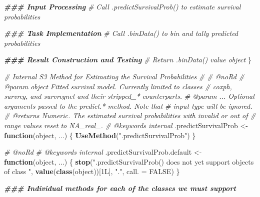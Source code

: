 \documentclass[
]{book}
\newenvironment{Shaded}{\begin{snugshade}}{\end{snugshade}}
\newcommand{\AttributeTok}[1]{\textcolor[rgb]{0.13,0.29,0.53}{#1}}
\newcommand{\CommentTok}[1]{\textcolor[rgb]{0.56,0.35,0.01}{\textit{#1}}}
\newcommand{\ConstantTok}[1]{\textcolor[rgb]{0.56,0.35,0.01}{#1}}
\newcommand{\ControlFlowTok}[1]{\textcolor[rgb]{0.13,0.29,0.53}{\textbf{#1}}}
\newcommand{\DocumentationTok}[1]{\textcolor[rgb]{0.56,0.35,0.01}{\textbf{\textit{#1}}}}
\newcommand{\FunctionTok}[1]{\textcolor[rgb]{0.13,0.29,0.53}{\textbf{#1}}}
\newcommand{\NormalTok}[1]{#1}
\newcommand{\OtherTok}[1]{\textcolor[rgb]{0.56,0.35,0.01}{#1}}
\newcommand{\StringTok}[1]{\textcolor[rgb]{0.31,0.60,0.02}{#1}}
\begin{document}
\begin{Shaded}
\begin{Highlighting}[]
  \DocumentationTok{\#\#\# Input Processing}
  \CommentTok{\# Call \textasciigrave{}.predictSurvivalProb()\textasciigrave{} to estimate survival probabilities}
  
  \DocumentationTok{\#\#\# Task Implementation}
  \CommentTok{\# Call \textasciigrave{}.binData()\textasciigrave{} to bin and tally predicted probabilities}
  
  \DocumentationTok{\#\#\# Result Construction and Testing}
  \CommentTok{\# Return \textasciigrave{}.binData()\textasciigrave{} value object}
\NormalTok{\}}

\CommentTok{\#\textquotesingle{} Internal S3 Method for Estimating the Survival Probabilities}
\CommentTok{\#\textquotesingle{} }
\CommentTok{\#\textquotesingle{} @noRd}
\CommentTok{\#\textquotesingle{} @param object Fitted survival model. Currently limited to classes}
\CommentTok{\#\textquotesingle{}   \textasciigrave{}coxph\textasciigrave{}, \textasciigrave{}survreg\textasciigrave{}, and \textasciigrave{}survregnet\textasciigrave{} and their \textasciigrave{}stripped\_*\textasciigrave{} counterparts.}
\CommentTok{\#\textquotesingle{} @param ... Optional arguments passed to the \textasciigrave{}predict.*\textasciigrave{} method. Note that}
\CommentTok{\#\textquotesingle{}   input \textasciigrave{}type\textasciigrave{} will be ignored.}
\CommentTok{\#\textquotesingle{} @returns Numeric. The estimated survival probabilities with invalid or out of}
\CommentTok{\#\textquotesingle{}   range values reset to NA\_real\_.}
\CommentTok{\#\textquotesingle{} @keywords internal}
\NormalTok{.predictSurvivalProb }\OtherTok{\textless{}{-}} \ControlFlowTok{function}\NormalTok{(object, ...) \{ }
  \FunctionTok{UseMethod}\NormalTok{(}\StringTok{".predictSurvivalProb"}\NormalTok{) }
\NormalTok{\}}

\CommentTok{\#\textquotesingle{} @noRd}
\CommentTok{\#\textquotesingle{} @keywords internal}
\NormalTok{.predictSurvivalProb.default }\OtherTok{\textless{}{-}} \ControlFlowTok{function}\NormalTok{(object, ...) \{}
  \FunctionTok{stop}\NormalTok{(}\StringTok{"\textasciigrave{}.predictSurvivalProb()\textasciigrave{} does not yet support objects of class "}\NormalTok{,}
       \FunctionTok{value}\NormalTok{(}\FunctionTok{class}\NormalTok{(object))[1L], }\StringTok{"."}\NormalTok{, }\AttributeTok{call. =} \ConstantTok{FALSE}\NormalTok{)}
\NormalTok{\}}

\DocumentationTok{\#\#\# Individual methods for each of the classes we must support}


\end{Highlighting}
\end{Shaded}
\end{document}
